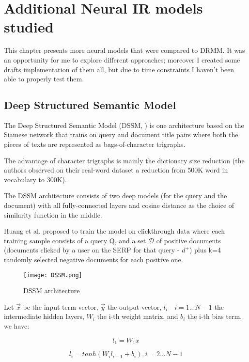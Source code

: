 \newpage
\chapter{Additional Neural IR models studied}

This chapter presents more neural models that were compared to
DRMM. It was an opportunity for me to explore different approaches;
moreover I created some drafts implementation of them all, but due
to time constraints I haven't been able to properly test them.

\section{Deep Structured Semantic Model}
\label{sec:dssm}

The Deep Structured Semantic Model (DSSM, \cite{dssm}) is one
architecture based on the Siamese network that trains on query and document
title pairs where both the pieces of texts are represented as
bags-of-character trigraphs.

The advantage of character trigraphs is mainly the dictionary size reduction
(the authors observed on their real-word dataset a reduction from 500K word in vocabulary to 300K).

The DSSM architecture consists of two deep models (for the query and the
document) with all fully-connected layers and cosine distance as the choice of
similarity function in the middle.

Huang et al. proposed to train the model on clickthrough data where
each training sample consists of a query Q, and a set $\mathcal{D}$ of positive
documents (documents clicked by a user on the SERP for that query - $d^+$) plus
k=4 randomly selected negative documents for each positive one.

\begin{figure}[H]
  \centering
  \texttt{[image: DSSM.png]}
  \caption{DSSM architecture}
  \label{fig:dssm_arch}
\end{figure}

Let $\vec{x}$ be the input term vector, $\vec{y}$ the output vector,
$l_i \quad i = 1...N-1$ the intermediate hidden layers, $W_i$ the i-th weight
matrix, and $b_i$ the i-th bias term, we have:

\begin{equation}
\tag{Input to first layer}
l_1 = W_1 x
\end{equation}

\begin{equation}
\tag{input to i-th layer}
l_i = tanh(W_i l_{i-1} + b_i), i = 2...N-1
\end{equation}

